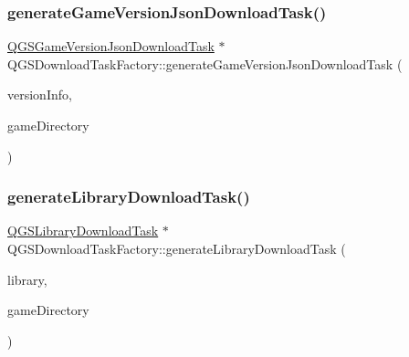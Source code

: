 \subsubsection{\texorpdfstring{generate\+Game\+Version\+Json\+Download\+Task()}{generateGameVersionJsonDownloadTask()}}
{\footnotesize\ttfamily \mbox{\hyperlink{class_q_g_s_game_version_json_download_task}{Q\+G\+S\+Game\+Version\+Json\+Download\+Task}} $\ast$ Q\+G\+S\+Download\+Task\+Factory\+::generate\+Game\+Version\+Json\+Download\+Task (\begin{DoxyParamCaption}\item[{const \mbox{\hyperlink{class_q_g_s_game_version_info}{Q\+G\+S\+Game\+Version\+Info}} \&}]{version\+Info,  }\item[{\mbox{\hyperlink{class_q_g_s_game_directory}{Q\+G\+S\+Game\+Directory}} \&}]{game\+Directory }\end{DoxyParamCaption})}

\mbox{\label{class_q_g_s_download_task_factory_a872f18398d986321b6b6a306b64c0eae}} 
\subsubsection{\texorpdfstring{generate\+Library\+Download\+Task()}{generateLibraryDownloadTask()}}
{\footnotesize\ttfamily \mbox{\hyperlink{class_q_g_s_library_download_task}{Q\+G\+S\+Library\+Download\+Task}} $\ast$ Q\+G\+S\+Download\+Task\+Factory\+::generate\+Library\+Download\+Task (\begin{DoxyParamCaption}\item[{const \mbox{\hyperlink{class_q_g_s_library}{Q\+G\+S\+Library}} \&}]{library,  }\item[{\mbox{\hyperlink{class_q_g_s_game_directory}{Q\+G\+S\+Game\+Directory}} \&}]{game\+Directory }\end{DoxyParamCaption})}

\mbox{\label{class_q_g_s_download_task_factory_a106703b80bbf6cc92047f8f8266fbf11}} 
